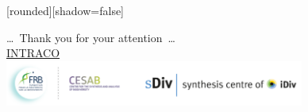 
{
  [rounded][shadow=false]
  \begin{frame}
    \begin{block}{}
      \begin{center}
        \ldots~Thank you for your attention~\ldots \\
        \href{https://www.fondationbiodiversite.fr/en/the-frb-in-action/programs-and-projects/le-cesab/intraco/}{INTRACO}\\
        \includegraphics[height=1.5cm]{figs/logos-FRB-Cesab-iDiv-sDiv}
      \end{center}
    \end{block}
  \end{frame}
}